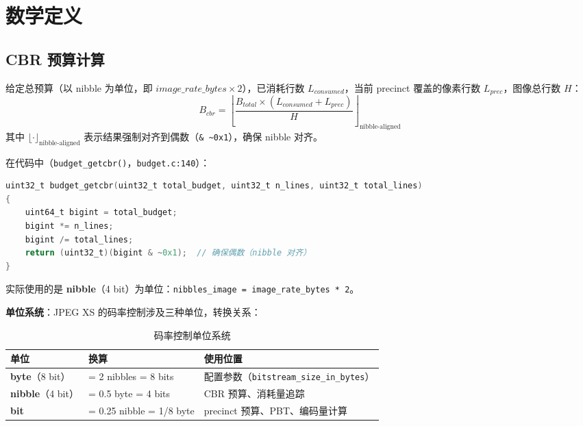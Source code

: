 \section{数学定义}

\subsection{CBR 预算计算}

给定总预算（以 nibble 为单位，即 $\mathit{image\_rate\_bytes} \times 2$），已消耗行数 $L_{\mathit{consumed}}$，当前 precinct 覆盖的像素行数 $L_{\mathit{prec}}$，图像总行数 $H$：
\begin{equation}\label{eq:cbr-budget}
B_{\mathit{cbr}} = \left\lfloor \frac{B_{\mathit{total}} \times (L_{\mathit{consumed}} + L_{\mathit{prec}})}{H} \right\rfloor_{\text{nibble-aligned}}
\end{equation}
其中 $\lfloor\cdot\rfloor_{\text{nibble-aligned}}$ 表示结果强制对齐到偶数（\texttt{\& \~{}0x1}），确保 nibble 对齐。

在代码中（\texttt{budget\_getcbr()}，\texttt{budget.c:140}）：

\begin{lstlisting}[language=C,caption={CBR 预算计算——\texttt{budget\_getcbr()}}]
uint32_t budget_getcbr(uint32_t total_budget, uint32_t n_lines, uint32_t total_lines)
{
    uint64_t bigint = total_budget;
    bigint *= n_lines;
    bigint /= total_lines;
    return (uint32_t)(bigint & ~0x1);  // 确保偶数（nibble 对齐）
}
\end{lstlisting}

实际使用的是 \textbf{nibble}（4 bit）为单位：\texttt{nibbles\_image = image\_rate\_bytes * 2}。

\textbf{单位系统}：JPEG XS 的码率控制涉及三种单位，转换关系：

\begin{table}[H]
\centering
\caption{码率控制单位系统}
\label{tab:rc-units}
\begin{tabular}{@{}lll@{}}
\toprule
单位 & 换算 & 使用位置 \\
\midrule
\textbf{byte}（8 bit） & = 2 nibbles = 8 bits & 配置参数（\texttt{bitstream\_size\_in\_bytes}） \\
\textbf{nibble}（4 bit） & = 0.5 byte = 4 bits & CBR 预算、消耗量追踪 \\
\textbf{bit} & = 0.25 nibble = 1/8 byte & precinct 预算、PBT、编码量计算 \\
\bottomrule
\end{tabular}
\end{table}

